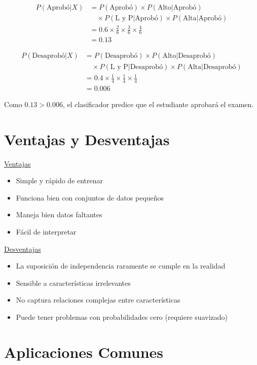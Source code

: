 \documentclass[12pt]{article}
\begin{document}
\begin{align*}
P(\text{Aprobó}|X) &= P(\text{Aprobó}) \times P(\text{Alto}|\text{Aprobó}) \\
&\quad \times P(\text{L y P}|\text{Aprobó}) \times P(\text{Alta}|\text{Aprobó}) \\
&= 0.6 \times \frac{2}{6} \times \frac{3}{6} \times \frac{4}{6} \\
&= 0.13
\end{align*}

\begin{align*}
P(\text{Desaprobó}|X) &= P(\text{Desaprobó}) \times P(\text{Alto}|\text{Desaprobó}) \\
&\quad \times P(\text{L y P}|\text{Desaprobó}) \times P(\text{Alta}|\text{Desaprobó}) \\
&= 0.4 \times \frac{1}{4} \times \frac{1}{4} \times \frac{1}{4} \\
&= 0.006
\end{align*}

Como $0.13 > 0.006$, el clasificador predice que el estudiante aprobará el examen.

\section{Ventajas y Desventajas}
\underline{Ventajas}
\begin{itemize}
    \item Simple y rápido de entrenar
    \item Funciona bien con conjuntos de datos pequeños
    \item Maneja bien datos faltantes
    \item Fácil de interpretar
\end{itemize}

\underline{Desventajas}
\begin{itemize}
    \item La suposición de independencia raramente se cumple en la realidad
    \item Sensible a características irrelevantes
    \item No captura relaciones complejas entre características
    \item Puede tener problemas con probabilidades cero (requiere suavizado)
\end{itemize}

\section{Aplicaciones Comunes}
\end{document}
